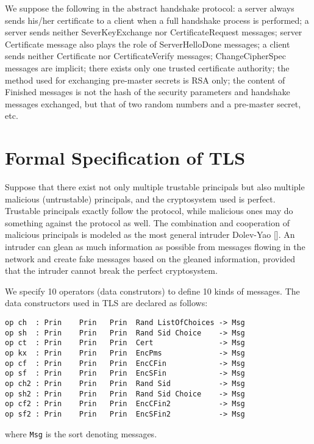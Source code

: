 \documentclass[a4paper,fleqn]{cas-dc}
\begin{document}
We suppose the following in the abstract handshake protocol: a server always sends his/her certificate to a client when a full handshake process is performed; a server sends neither SeverKeyExchange nor CertificateRequest messages; server Certificate message also plays the role of ServerHelloDone messages; a client sends neither Certificate nor CertificateVerify messages; ChangeCipherSpec messages are implicit; there exists only one trusted certificate authority; the method used for exchanging pre-master secrets is RSA only; the content of Finished messages is not the hash of the security parameters and handshake messages exchanged, but that of two random numbers and a pre-master secret, etc.

\section{Formal Specification of TLS} \label{fstls}
Suppose that there exist not only multiple trustable
principals but also multiple malicious (untrustable) principals, and the cryptosystem used is perfect. Trustable
principals exactly follow the protocol, while malicious ones may do something against the protocol as well. The combination and cooperation of malicious principals is modeled as the most general intruder Dolev-Yao [\cite{dolev}]. 
An intruder can glean as much information as possible from messages flowing in the network and create fake messages based on the gleaned information, provided that the intruder cannot break the perfect cryptosystem.

We specify 10 operators (data construtors) to define 10 kinds of messages. The data constructors used in TLS are declared as follows:
\begin{small}
		\begin{verbatim}
op ch  : Prin    Prin   Prin  Rand ListOfChoices -> Msg
op sh  : Prin    Prin   Prin  Rand Sid Choice    -> Msg
op ct  : Prin    Prin   Prin  Cert               -> Msg
op kx  : Prin    Prin   Prin  EncPms             -> Msg
op cf  : Prin    Prin   Prin  EncCFin            -> Msg
op sf  : Prin    Prin   Prin  EncSFin            -> Msg
op ch2 : Prin    Prin   Prin  Rand Sid           -> Msg
op sh2 : Prin    Prin   Prin  Rand Sid Choice    -> Msg
op cf2 : Prin    Prin   Prin  EncCFin2           -> Msg
op sf2 : Prin    Prin   Prin  EncSFin2           -> Msg
		\end{verbatim}
	\end{small}
where \verb!Msg! is the sort denoting messages. 
\end{document}
